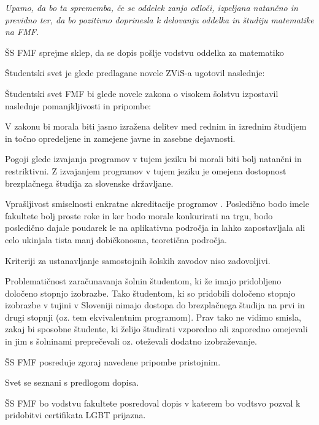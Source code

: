 \documentclass{seja}
\begin{document}
\begin{ad}
\emph{Upamo, da bo ta sprememba, če se oddelek zanjo odloči, izpeljana natančno in previdno ter, da bo pozitivno doprinesla k delovanju oddelka in študiju matematike na FMF.}

\begin{sklep*}
ŠS FMF sprejme sklep, da se dopis pošlje vodstvu oddelka za matematiko
\end{sklep*}

\item Študentski svet je glede predlagane novele ZViS-a ugotovil naslednje:

Študentski svet FMF bi glede novele zakona o visokem šolstvu izpostavil naslednje pomanjkljivosti
in pripombe:
\begin{enumerate*}
\item V zakonu bi morala biti jasno izražena delitev med rednim in izrednim študijem in točno opredeljene
in zamejene javne in zasebne dejavnosti.
\item Pogoji glede izvajanja programov v tujem jeziku bi morali biti bolj natančni in restriktivni.
Z izvajanjem programov v tujem jeziku je omejena dostopnost brezplačnega študija za slovenske
državljane.
\item Vprašljivost smiselnosti enkratne akreditacije programov . Posledično bodo imele fakultete bolj
proste roke in ker bodo morale konkurirati na trgu, bodo posledično dajale poudarek le na aplikativna
področja in lahko zapostavljala ali celo ukinjala tista manj dobičkonosna, teoretična področja.
\item Kriteriji za ustanavljanje samostojnih šolskih zavodov niso zadovoljivi.
\item Problematičnost zaračunavanja šolnin študentom, ki že imajo pridobljeno določeno stopnjo izobrazbe.
Tako študentom, ki so pridobili določeno stopnjo izobrazbe v tujini v Sloveniji nimajo
dostopa do brezplačnega študija na prvi in drugi stopnji (oz. tem ekvivalentnim programom). Prav tako ne vidimo smisla, zakaj bi sposobne študente, ki želijo študirati vzporedno ali zaporedno omejevali in jim s šolninami preprečevali oz. oteževali dodatno izobraževanje.
\end{enumerate*}

\begin{sklep*}
ŠS FMF posreduje zgoraj navedene pripombe pristojnim.
\end{sklep*}

\item Svet se seznani s predlogom dopisa.
\begin{sklep*}
ŠS FMF bo vodstvu fakultete posredoval dopis v katerem bo vodtsvo pozval k pridobitvi
certifikata LGBT prijazna.
\end{sklep*}
\end{ad}

\makeatletter \global\let\@enddocumenthook\@empty \makeatother
{}
\end{document}
